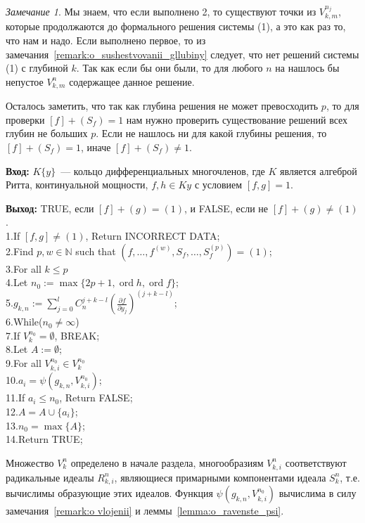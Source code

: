 \documentclass[16pt]{article}
\DeclareMathOperator{\ord}{ord}
\renewcommand{\le}{\leqslant} %
\theoremstyle{plain1}
\theoremstyle{plain2}
\theoremstyle{plain}
\theoremstyle{plain3}
\theoremstyle{definition}
\theoremstyle{remark}
\newtheorem{remark}[theorem1]{Замечание}
\begin{document}
\begin{remark}
Мы знаем, что если выполнено 2, то существуют точки из ${V}_{k,m}^{n_j}$, которые продолжаются до формального решения системы (1), а это как раз то, что нам и надо. Если выполнено первое, то из замечания~\ref{remark:o_sushestvovanii_gllubiny} следует, что нет решений системы (1)  с глубиной $k$. Так как если бы они были, то для любого $n$ на нашлось бы непустое ${V}_{k,m}^{n}$ содержащее данное решение.

Осталось заметить, что так как глубина решения не может превосходить $p$, то для проверки $[f]+(S_f)=1$ нам нужно проверить существование решений всех глубин не больших $p$. Если не нашлось ни для какой глубины решения, то $[f]+(S_f)=1$, иначе $[f]+(S_f)\neq1$.
\end{remark}

{\bf Вход:} $K\{y\}$~--- кольцо дифференциальных многочленов, где $K$ является алгеброй Ритта, континуальной мощности, $f,h\in K{y}$ с условием $[f,g]=1$.

{\bf Выход:} TRUE, если  $[f]+(g)=(1)$, и FALSE, если не $[f]+(g)\not=(1)$.
\\
1.\qquad If $[f,g]\not=(1)$, Return  INCORRECT DATA;\\
2.\qquad Find $p,w\in \mathbb{N}$ such that $(f,\ldots,f^{(w)},S_f,\ldots,S_f^{(p)})=(1)$;\\
3.\qquad For all $k\le p$\\
4.\qquad\qquad Let $n_0:=\max\{ 2p+1,\ord{h},\ord{f}\}$;\\
5.\qquad\qquad $g_{k,n}:=\sum\limits_{j=0}^{l}C_n^{j+k - l }\left(\frac{\partial f}{\partial y_j}\right)^{(j+k - l)}$;\\
6.\qquad\qquad While($n_0\not=\infty$)\\
7.\qquad\qquad\qquad If $V_k^{n_0}=\emptyset$, BREAK;\\
8.\qquad\qquad\qquad Let $A:=\emptyset$;\\
9.\qquad\qquad\qquad For all ${V}_{k,i}^{n_0}\in V_k^{n_0}$\\
10.\qquad\qquad\qquad\qquad $a_i=\psi(g_{k,n},{V}_{k,i}^{n_0})$;\\
11.\qquad\qquad\qquad\qquad If $a_i\le n_0$, Return FALSE;\\
12.\qquad\qquad\qquad\qquad $A=A\cup\{a_i\}$;\\
13.\qquad\qquad\qquad $n_0=\max\{A\}$;\\
14.\qquad Return TRUE;

Множество $V_k^{n}$ определено в начале раздела, многообразиям ${V}_{k,i}^{n}$ соответствуют радикальные идеалы $R_{k,i}^{n}$, являющиеся примарными компонентами идеала $S_k^n$, т.е. вычислимы образующие этих идеалов. 
Функция $\psi(g_{k,n},{V}_{k,i}^{n_0})$ вычислима в силу замечания~\ref{remark:o vlojenii} и леммы~\ref{lemma:o_ravenste_psi}.
\end{document}
